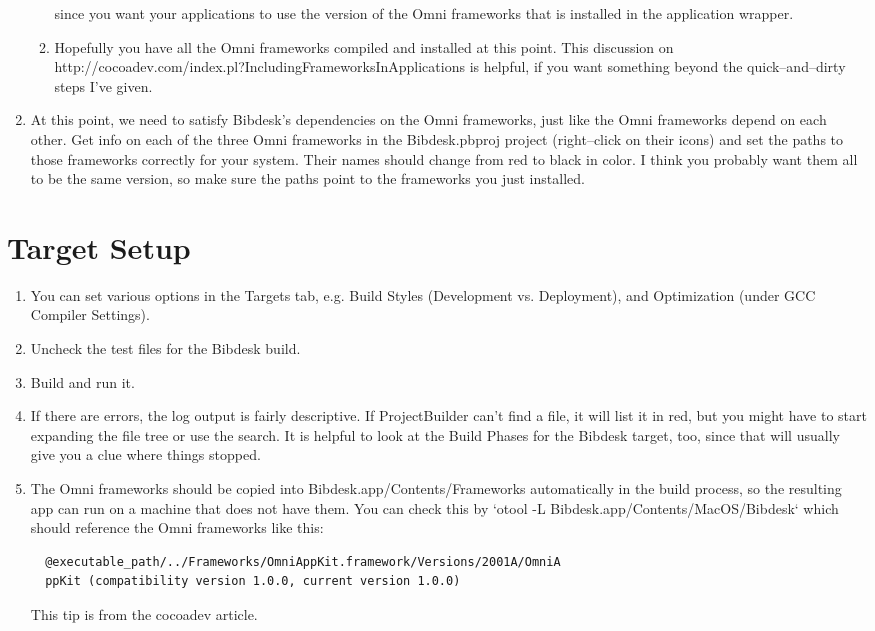 \documentclass[11pt]{article}
\begin{document}
\begin{enumerate}
\begin{enumerate}
since you want your applications to use the version of the Omni frameworks that is installed in
the application wrapper.
  \item Hopefully you have all the Omni frameworks compiled and installed at this point.  This
discussion on http://cocoadev.com/index.pl?IncludingFrameworksInApplications is helpful, if you want
something beyond the quick--and--dirty steps I've given.
  \end{enumerate}
\item At this point, we need to satisfy Bibdesk's dependencies on the Omni frameworks, just like the
Omni frameworks depend on each other.  Get info on each of the three Omni frameworks in the
Bibdesk.pbproj project (right--click on their icons) and set the paths to those frameworks correctly
for your system.  Their names should change from red to black in color.  I think you probably want
them all to be the same version, so make sure the paths point to the frameworks you just installed.
\end{enumerate}

\section{Target Setup}
\begin{enumerate}
\item You can set various options in the Targets tab, e.g. Build Styles (Development vs. Deployment),
and Optimization (under GCC Compiler Settings).
\item Uncheck the test files for the Bibdesk build.
\item Build and run it.
\item If there are errors, the log output is fairly descriptive.  If ProjectBuilder can't find a
file, it will list it in red, but you might have to start expanding the file tree or use the
search.  It is helpful to look at the Build Phases for the Bibdesk target, too, since that will
usually give you a clue where things stopped.
\item The Omni frameworks should be copied into Bibdesk.app/Contents/Frameworks automatically in the
build process, so the resulting app can run on a machine that does not have them.  You can check
this by `otool -L Bibdesk.app/Contents/MacOS/Bibdesk` which should reference the Omni frameworks
like this:  \begin{verbatim}
  @executable_path/../Frameworks/OmniAppKit.framework/Versions/2001A/OmniA
  ppKit (compatibility version 1.0.0, current version 1.0.0)
\end{verbatim}  This tip is from the cocoadev article.
\end{enumerate}


 
\end{document}

